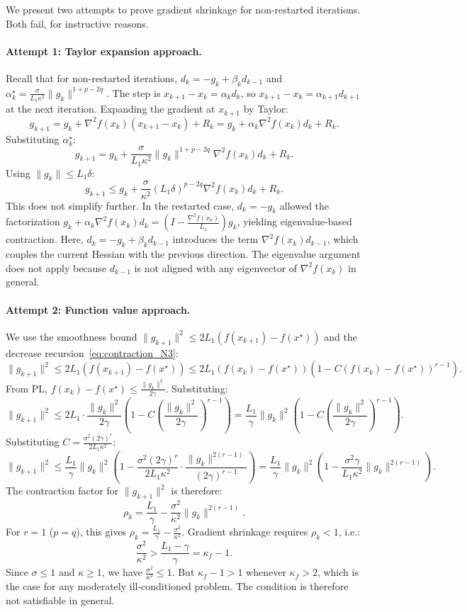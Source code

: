 \documentclass{article}
\begin{document}
We present two attempts to prove gradient shrinkage for non-restarted iterations. Both fail, for instructive reasons.

\paragraph{Attempt 1: Taylor expansion approach.} Recall that for non-restarted iterations, $d_k = -g_k + \beta_k d_{k-1}$ and $\alpha_k^\star = \frac{\sigma}{L_1\kappa^2}\|g_k\|^{1+p-2q}$. The step is $x_{k+1} - x_k = \alpha_k d_k$, so $x_{k+1} - x_k = \alpha_{k+1}d_{k+1}$ at the next iteration. Expanding the gradient at $x_{k+1}$ by Taylor:
\[
g_{k+1} = g_k + \nabla^2 f(x_k)(x_{k+1} - x_k) + R_k = g_k + \alpha_k\nabla^2 f(x_k) d_k + R_k.
\]
Substituting $\alpha_k^\star$:
\[
g_{k+1} = g_k + \frac{\sigma}{L_1\kappa^2}\|g_k\|^{1+p-2q}\nabla^2 f(x_k) d_k + R_k.
\]
Using $\|g_k\| \leq L_1\delta$:
\[
g_{k+1} \leq g_k + \frac{\sigma}{\kappa^2}(L_1\delta)^{p-2q}\nabla^2 f(x_k) d_k + R_k.
\]
This does not simplify further. In the restarted case, $d_k = -g_k$ allowed the factorization $g_k + \alpha_k\nabla^2 f(x_k)d_k = (I - \frac{\nabla^2 f(x_k)}{L_1})g_k$, yielding eigenvalue-based contraction. Here, $d_k = -g_k + \beta_k d_{k-1}$ introduces the term $\nabla^2 f(x_k)d_{k-1}$, which couples the current Hessian with the previous direction. The eigenvalue argument does not apply because $d_{k-1}$ is not aligned with any eigenvector of $\nabla^2 f(x_k)$ in general.

\paragraph{Attempt 2: Function value approach.} We use the smoothness bound $\|g_{k+1}\|^2 \leq 2L_1(f(x_{k+1}) - f(x^\star))$ and the decrease recursion~\eqref{eq:contraction_N3}:
\[
\|g_{k+1}\|^2 \leq 2L_1(f(x_{k+1}) - f(x^\star)) \leq 2L_1(f(x_k) - f(x^\star))\left(1 - C(f(x_k) - f(x^\star))^{r-1}\right).
\]
From PL, $f(x_k) - f(x^\star) \leq \frac{\|g_k\|^2}{2\gamma}$. Substituting:
\[
\|g_{k+1}\|^2 \leq 2L_1 \cdot \frac{\|g_k\|^2}{2\gamma}\left(1 - C\left(\frac{\|g_k\|^2}{2\gamma}\right)^{r-1}\right) = \frac{L_1}{\gamma}\|g_k\|^2\left(1 - C\left(\frac{\|g_k\|^2}{2\gamma}\right)^{r-1}\right).
\]
Substituting $C = \frac{\sigma^2(2\gamma)^r}{2L_1\kappa^2}$:
\[
\|g_{k+1}\|^2 \leq \frac{L_1}{\gamma}\|g_k\|^2\left(1 - \frac{\sigma^2(2\gamma)^r}{2L_1\kappa^2}\cdot\frac{\|g_k\|^{2(r-1)}}{(2\gamma)^{r-1}}\right) = \frac{L_1}{\gamma}\|g_k\|^2\left(1 - \frac{\sigma^2\gamma}{L_1\kappa^2}\|g_k\|^{2(r-1)}\right).
\]
The contraction factor for $\|g_{k+1}\|^2$ is therefore:
\[
\rho_k = \frac{L_1}{\gamma} - \frac{\sigma^2}{\kappa^2}\|g_k\|^{2(r-1)}.
\]
For $r = 1$ ($p = q$), this gives $\rho_k = \frac{L_1}{\gamma} - \frac{\sigma^2}{\kappa^2}$. Gradient shrinkage requires $\rho_k < 1$, i.e.:
\[
\frac{\sigma^2}{\kappa^2} > \frac{L_1 - \gamma}{\gamma} = \kappa_f - 1.
\]
Since $\sigma \leq 1$ and $\kappa \geq 1$, we have $\frac{\sigma^2}{\kappa^2} \leq 1$. But $\kappa_f - 1 > 1$ whenever $\kappa_f > 2$, which is the case for any moderately ill-conditioned problem. The condition is therefore not satisfiable in general.
\end{document}
